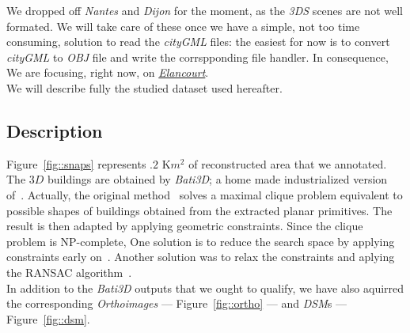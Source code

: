 \documentclass[../main.tex]{subfiles}
\begin{document}
    We dropped off \textit{Nantes} and \textit{Dijon} for the moment, as the \textit{3DS} scenes are not well formated. We will take care of these once we have a simple, not too time consuming, solution to read the \textit{cityGML} files: the easiest for now is to convert \textit{cityGML} to \textit{OBJ} file and write the corrspponding file handler. In consequence, We are focusing, right now, on \href{https://www.google.fr/maps/place/%C3%89lancourt/@48.7781732,1.9536264,5868m/data=!3m1!1e3!4m13!1m7!3m6!1s0x47e68370e965167b:0x705d83a4167c877c!2s%C3%89lancourt!3b1!8m2!3d48.782907!4d1.960077!3m4!1s0x47e68370e965167b:0x705d83a4167c877c!8m2!3d48.782907!4d1.960077}{\textit{Elancourt}}.\\

    We will describe fully the studied dataset used hereafter.

    \subsection{Description}

    Figure~\ref{fig::snaps} represents $.2\text{ K}m^2$ of reconstructed area that we annotated. The $3D$ buildings are obtained by \textit{Bati3D}; a home made industrialized version of~\cite{durupt2006automatic, taillandier2004automatic, taillandier2005}. Actually, the original method~\cite{taillandier2004automatic} solves a maximal clique problem equivalent to possible shapes of buildings obtained from the extracted planar primitives. The result is then adapted by applying geometric constraints. Since the clique problem is NP-complete, One solution is to reduce the search space by applying constraints early on~\cite{taillandier2005}. Another solution was to relax the constraints and aplying the RANSAC algorithm~\cite{Fischler:1981:RSC:358669.358692}.\\

    In addition to the \textit{Bati3D} outputs that we ought to qualify, we have also aquirred the corresponding \textit{Orthoimages} --- Figure~\ref{fig::ortho} --- and \textit{DSM}s --- Figure~\ref{fig::dsm}.
\end{document}
